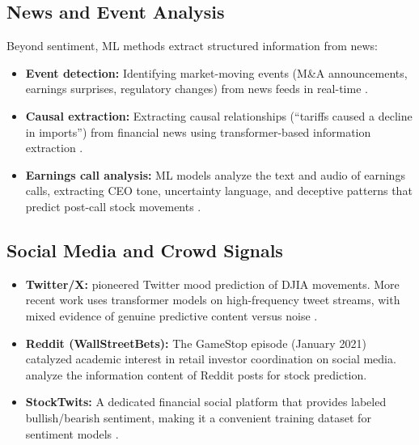 \subsection{News and Event Analysis}

Beyond sentiment, ML methods extract structured information from news:

\begin{itemize}[leftmargin=*]
    \item \textbf{Event detection:} Identifying market-moving events (M\&A announcements, earnings surprises, regulatory changes) from news feeds in real-time \citep{EinDor2020}.

    \item \textbf{Causal extraction:} Extracting causal relationships (``tariffs caused a decline in imports'') from financial news using transformer-based information extraction \citep{Mariko2022}.

    \item \textbf{Earnings call analysis:} ML models analyze the text and audio of earnings calls, extracting CEO tone, uncertainty language, and deceptive patterns that predict post-call stock movements \citep{Li2021, Qin2019}.
\end{itemize}

\subsection{Social Media and Crowd Signals}

\begin{itemize}[leftmargin=*]
    \item \textbf{Twitter/X:} \citet{Bollen2011} pioneered Twitter mood prediction of DJIA movements. More recent work uses transformer models on high-frequency tweet streams, with mixed evidence of genuine predictive content versus noise \citep{Renault2020}.

    \item \textbf{Reddit (WallStreetBets):} The GameStop episode (January 2021) catalyzed academic interest in retail investor coordination on social media. \citet{Bradley2021} analyze the information content of Reddit posts for stock prediction.

    \item \textbf{StockTwits:} A dedicated financial social platform that provides labeled bullish/bearish sentiment, making it a convenient training dataset for sentiment models \citep{Oliveira2017}.
\end{itemize}

